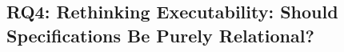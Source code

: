 \documentclass{article}
\theoremstyle{plain}
\theoremstyle{definition}
\theoremstyle{remark}
\begin{document}






\subsection{RQ4: Rethinking Executability: Should Specifications Be Purely Relational?}
\label{sec:rq4}



\end{document}
